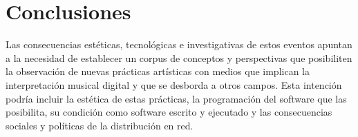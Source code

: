 
\section*{Conclusiones}








Las consecuencias estéticas, tecnológicas e investigativas de estos eventos apuntan a la necesidad de establecer un corpus de conceptos y perspectivas que posibiliten la observación de nuevas prácticas artísticas con medios \citep{shankenCanon} que implican la interpretación musical digital y que se desborda a otros campos. Esta intención podría incluir la estética de estas prácticas, la programación del software que las posibilita, su condición como software escrito y ejecutado \citep{speakingCode} y las consecuencias sociales y políticas de la distribución en red. 

